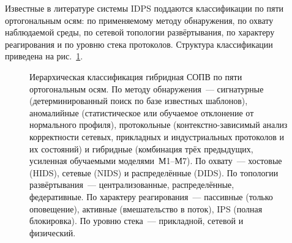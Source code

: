 Известные в литературе системы IDPS поддаются классификации по пяти
ортогональным осям: по применяемому методу обнаружения, по охвату
наблюдаемой среды, по сетевой топологии развёртывания, по
характеру реагирования и по уровню стека протоколов. Структура
классификации приведена на рис.~\ref{fig:orga_classes_idps}.

\begin{figure}[htbp]
\centering
{}
\caption{Иерархическая классификация гибридная СОПВ по пяти
ортогональным осям. По методу обнаружения~--- сигнатурные
(детерминированный поиск по базе известных шаблонов), аномалийные
(статистическое или обучаемое отклонение от нормального профиля),
протокольные (контекстно-зависимый анализ корректности сетевых,
прикладных и индустриальных протоколов и их состояний) и гибридные
(комбинация трёх предыдущих, усиленная обучаемыми моделями~М1--М7).
По охвату~--- хостовые (HIDS), сетевые (NIDS) и распределённые (DIDS).
По топологии развёртывания~--- централизованные, распределённые,
федеративные. По характеру реагирования~--- пассивные (только
оповещение), активные (вмешательство в поток), IPS (полная
блокировка). По уровню стека~--- прикладной, сетевой и физический.}
\label{fig:orga_classes_idps}
\end{figure}

